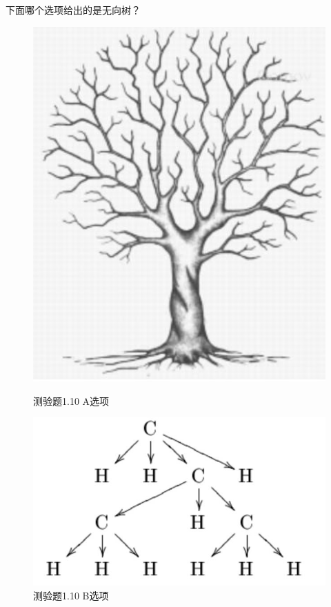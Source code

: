 \documentclass[UTF8, heading=true]{ctexart}
\begin{document}
下面哪个选项给出的是无向树？

\begin{figure}[htbp]
  \centering
  \begin{minipage}[t]{0.2\textwidth}
      \centering
      \includegraphics[width=1\textwidth]{1.10_1.jpg} %
      \caption{测验题1.10 A选项}
  \end{minipage}
  \hspace{0.1\textwidth} %
  \begin{minipage}[t]{0.35\textwidth}
      \centering
      \includegraphics[width=1\textwidth]{1.10_2.jpg} %
      \caption{测验题1.10 B选项}
\end{minipage}
\end{figure}
\end{document}
